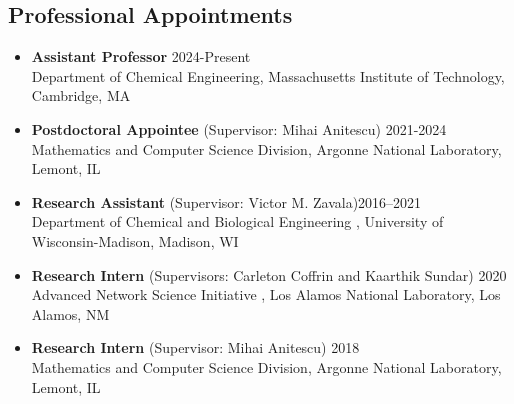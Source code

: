 \documentclass[letterpaper, 11pt]{article}
\begin{document}
\subsection*{Professional Appointments}
\begin{itemize}[itemsep=1pt, parsep=0pt,leftmargin=*]
\item[] {\bf Assistant Professor} \hfill 2024-Present\\
  Department of Chemical Engineering, Massachusetts Institute of Technology, Cambridge, MA  
\item[] {\bf Postdoctoral Appointee} (Supervisor: Mihai Anitescu) \hfill 2021-2024\\
  Mathematics and Computer Science Division, Argonne National Laboratory, Lemont, IL
\item[] {\bf Research Assistant} (Supervisor: Victor M. Zavala)\hfill 2016--2021\\
  Department of Chemical and Biological Engineering , University of Wisconsin-Madison, Madison, WI 
\item[] {\bf Research Intern} (Supervisors: Carleton Coffrin and Kaarthik Sundar) \hfill 2020\\
  Advanced Network Science Initiative , Los Alamos National Laboratory, Los Alamos, NM  
\item[] {\bf Research Intern} (Supervisor: Mihai Anitescu) \hfill 2018\\
  Mathematics and Computer Science Division, Argonne National Laboratory, Lemont, IL
\end{itemize}
\end{document}
